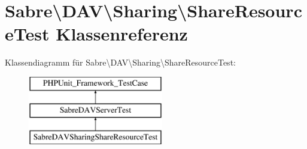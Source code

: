 \hypertarget{class_sabre_1_1_d_a_v_1_1_sharing_1_1_share_resource_test}{}\section{Sabre\textbackslash{}D\+AV\textbackslash{}Sharing\textbackslash{}Share\+Resource\+Test Klassenreferenz}
\label{class_sabre_1_1_d_a_v_1_1_sharing_1_1_share_resource_test}
Klassendiagramm für Sabre\textbackslash{}D\+AV\textbackslash{}Sharing\textbackslash{}Share\+Resource\+Test\+:\begin{figure}[H]
\begin{center}
\leavevmode
\includegraphics[height=3.000000cm]{class_sabre_1_1_d_a_v_1_1_sharing_1_1_share_resource_test}
\end{center}
\end{figure}
